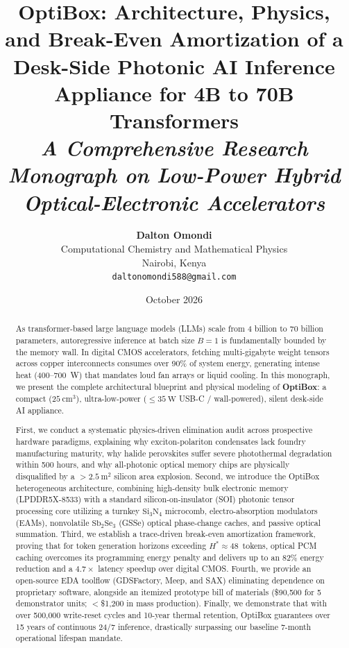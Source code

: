 \documentclass[11pt,a4paper]{report}
\title{\Huge \textbf{OptiBox: Architecture, Physics, and Break-Even Amortization of a Desk-Side Photonic AI Inference Appliance for 4B to 70B Transformers}\\[0.5em]
\large \textit{A Comprehensive Research Monograph on Low-Power Hybrid Optical-Electronic Accelerators}}
\author{\textbf{Dalton Omondi}\\
Computational Chemistry and Mathematical Physics\\
Nairobi, Kenya\\
\texttt{daltonomondi588@gmail.com}}
\date{October 2026}
\begin{document}
\maketitle

\begin{abstract}
As transformer-based large language models (LLMs) scale from 4 billion to 70 billion parameters, autoregressive inference at batch size $B=1$ is fundamentally bounded by the memory wall. In digital CMOS accelerators, fetching multi-gigabyte weight tensors across copper interconnects consumes over 90\% of system energy, generating intense heat (400--700~W) that mandates loud fan arrays or liquid cooling. In this monograph, we present the complete architectural blueprint and physical modeling of \textbf{OptiBox}: a compact ($25~\text{cm}^3$), ultra-low-power ($\le 35~\text{W}$ USB-C / wall-powered), silent desk-side AI appliance. 

First, we conduct a systematic physics-driven elimination audit across prospective hardware paradigms, explaining why exciton-polariton condensates lack foundry manufacturing maturity, why halide perovskites suffer severe photothermal degradation within 500 hours, and why all-photonic optical memory chips are physically disqualified by a $>2.5~\text{m}^2$ silicon area explosion. Second, we introduce the OptiBox heterogeneous architecture, combining high-density bulk electronic memory (LPDDR5X-8533) with a standard silicon-on-insulator (SOI) photonic tensor processing core utilizing a turnkey $\text{Si}_3\text{N}_4$ microcomb, electro-absorption modulators (EAMs), nonvolatile $\text{Sb}_2\text{Se}_3$ (GSSe) optical phase-change caches, and passive optical summation. Third, we establish a trace-driven break-even amortization framework, proving that for token generation horizons exceeding $H^* \approx 48$~tokens, optical PCM caching overcomes its programming energy penalty and delivers up to an 82\% energy reduction and a $4.7\times$ latency speedup over digital CMOS. Fourth, we provide an open-source EDA toolflow (GDSFactory, Meep, and SAX) eliminating dependence on proprietary software, alongside an itemized prototype bill of materials (\$90,500 for 5 demonstrator units; $<$\$1,200 in mass production). Finally, we demonstrate that with over 500,000 write-reset cycles and 10-year thermal retention, OptiBox guarantees over 15 years of continuous 24/7 inference, drastically surpassing our baseline 7-month operational lifespan mandate.
\end{abstract}
\end{document}

